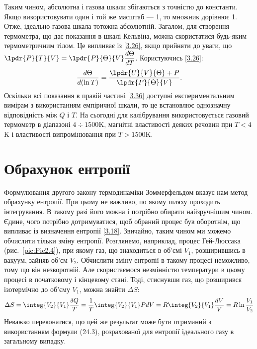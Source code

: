 Таким чином, абсолютна і газова шкали збігаються з точністю до константи. Якщо використовувати один і
той же масштаб --- 1\celsius, то множник дорівнює 1. Отже, ідеально-газова шкала тотожна абсолютній.
Загалом, для створення термометра, що дає показання в шкалі Кельвіна, можна скористатися будь-яким
термометричним тілом. Це випливає із \eqref{3.26}, якщо прийняти до уваги, що $\lpdr{P}{T}{V} =
\lpdr{P}{\Theta}{V} \dfrac{d\Theta}{dT}$.
Користуючись \eqref{3.26}:
\begin{equation}\label{3.36}
	\dfrac{d\Theta}{d(\ln T)} = \dfrac{\lpdr{U}{V}{\Theta} + P}{\lpdr{P}{\Theta}{V}}.
\end{equation}
Оскільки всі показання в правій частині \eqref{3.36} доступні експериментальним вимірам з
використанням емпіричної шкали, то це встановлює однозначну відповідність між $Q$ і $T$. На сьогодні
для калібрування використовується газовий термометр в діапазоні $4\div1500$\degree K, магнітні
властивості деяких речовин при $T<4$\degree K і властивості випромінювання при $T>1500$\degree K.

\section{Обрахунок ентропії}

Формулювання другого закону термодинаміки Зоммерфельдом вказує нам метод обрахунку ентропії. При цьому
не важливо, по якому шляху проходить інтегрування. В такому разі його можна і потрібно обирати
найзручнішим чином. Єдине, чого потрібно дотримуватися, щоб обраний процес був оборотнім, що випливає
із визначення ентропії \eqref{3.18}. Звичайно, таким чином ми можемо обчислити тільки зміну ентропії.
Розглянемо, наприклад, процес Гей-Люссака (рис.~\ref{pic:Pic2.4}), при якому газ, що знаходиться в
об'ємі $V_1$, розширившись
в вакуум, зайняв об'єм $V_2$. Обчислити зміну ентропії в такому процесі неможливо, тому що він
незворотній. Але скористаємося незмінністю температури в цьому процесі в початковому і кінцевому
стані. Тоді, стиснувши газ, що розширився ізотермічно до об'єму $V_1$, можна знайти $\Delta S$:
\begin{equation}\label{3.37}
	\Delta S = \integ{V_2}{V_1}\dfrac{\delta Q}{T} =\dfrac{1}{T} \integ{V_2}{V_1}PdV = R\integ{V_2}{V_1}\dfrac{dV}{V} = R\ln\dfrac{V_1}{V_2}
\end{equation}
Неважко переконатися, що цей же результат може бути отриманий з використанням формули (24.3),
розрахованої для ентропії ідеального газу в загальному випадку.

